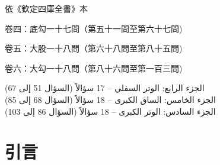 \documentclass[11pt,a4paper]{article}
\begin{document}
\begin{titlepage}
\begin{center}
\vfill

{\small 依《欽定四庫全書》本}

\vspace{0.2cm}

{\small\color{notecolor} 卷四：底勾一十七問（第五十一問至第六十七問)}

{\small\color{notecolor} 卷五：大股一十八問（第六十八問至第八十五問)}

{\small\color{notecolor} 卷六：大勾一十八問（第八十六問至第一百三問)}

\vspace{0.3cm}

{\small\arabicfont\beginR\color{notecolor}
الجزء الرابع: الوتر السفلي -- 17 سؤالاً (السؤال 51 إلى 67)\\
الجزء الخامس: الساق الكبرى -- 18 سؤالاً (السؤال 68 إلى 85)\\
الجزء السادس: الوتر الكبرى -- 18 سؤالاً (السؤال 86 إلى 103)
\endR}

\end{center}
\end{titlepage}

\tableofcontents
\newpage

\section*{引言}
\end{document}
